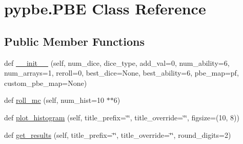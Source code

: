\hypertarget{classpypbe_1_1_p_b_e}{}\section{pypbe.\+P\+BE Class Reference}
\label{classpypbe_1_1_p_b_e}
\subsection*{Public Member Functions}
\begin{DoxyCompactItemize}
\item 
def \hyperlink{classpypbe_1_1_p_b_e_ad36bf08bcbbbc904fb3ea360c18f694c}{\+\_\+\+\_\+init\+\_\+\+\_\+} (self, num\+\_\+dice, dice\+\_\+type, add\+\_\+val=0, num\+\_\+ability=6, num\+\_\+arrays=1, reroll=0, best\+\_\+dice=None, best\+\_\+ability=6, pbe\+\_\+map=\textquotesingle{}pf\textquotesingle{}, custom\+\_\+pbe\+\_\+map=None)
\item 
def \hyperlink{classpypbe_1_1_p_b_e_aff58246daa59e87f0261afc04a43f98e}{roll\+\_\+mc} (self, num\+\_\+hist=10 $\ast$$\ast$6)
\item 
def \hyperlink{classpypbe_1_1_p_b_e_a84bc2f7406dfee08c190e47d0c719554}{plot\+\_\+histogram} (self, title\+\_\+prefix=\char`\"{}\char`\"{}, title\+\_\+override=\char`\"{}\char`\"{}, figsize=(10, 8))
\item 
def \hyperlink{classpypbe_1_1_p_b_e_a8b3a78c46718bf12b2cb9e548d81528d}{get\+\_\+results} (self, title\+\_\+prefix=\char`\"{}\char`\"{}, title\+\_\+override=\char`\"{}\char`\"{}, round\+\_\+digits=2)
\end{DoxyCompactItemize}
